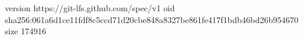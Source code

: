 version https://git-lfs.github.com/spec/v1
oid sha256:061a6d1ce11fdf8c5ccd71d20cbe848a8327be861fe417f1bdb46bd26b954670
size 174916
